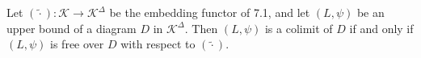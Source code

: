 Let $(\tilde{\cdot}): \mathcal{K} \longrightarrow \mathcal{K}^{\Delta}$ be the embedding functor of 7.1, and let $(L, \psi)$ be an upper bound of a diagram $D$ in $\mathcal{K}^{\Delta}$. Then $(L, \psi)$ is a colimit of $D$ if and only if $(L, \psi)$ is free over $D$ with respect to $(\tilde{\cdot})$.

